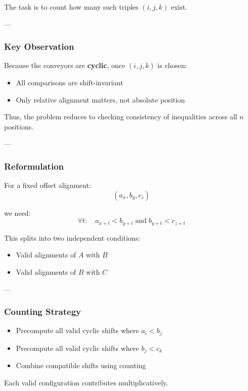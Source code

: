 \documentclass[11pt]{article}
\begin{document}
The task is to count how many such triples $(i,j,k)$ exist.

---

\subsubsection{Key Observation}

Because the conveyors are \textbf{cyclic}, once $(i,j,k)$ is chosen:
\begin{itemize}
    \item All comparisons are shift-invariant
    \item Only relative alignment matters, not absolute position
\end{itemize}

Thus, the problem reduces to checking consistency of inequalities
across all $n$ positions.

---

\subsubsection{Reformulation}

For a fixed offset alignment:
\[
(a_x, b_y, c_z)
\]

we need:
\[
\forall t:\quad
a_{x+t} < b_{y+t} \;\text{and}\; b_{y+t} < c_{z+t}
\]

This splits into two independent conditions:
\begin{itemize}
    \item Valid alignments of $A$ with $B$
    \item Valid alignments of $B$ with $C$
\end{itemize}

---

\subsubsection{Counting Strategy}

\begin{itemize}
    \item Precompute all valid cyclic shifts where $a_i < b_j$
    \item Precompute all valid cyclic shifts where $b_j < c_k$
    \item Combine compatible shifts using counting
\end{itemize}

Each valid configuration contributes multiplicatively.
\end{document}
